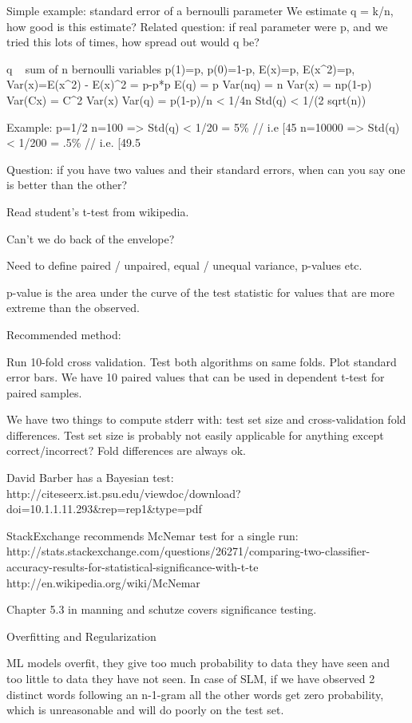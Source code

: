 \documentclass[ignorenonframetext]{beamer}
\begin{document}
Simple example: standard error of a bernoulli parameter
We estimate q = k/n, how good is this estimate?
Related question: if real parameter were p, and we tried this lots of
times, how spread out would q be?

q ~ sum of n bernoulli variables
p(1)=p, p(0)=1-p, E(x)=p, E(x^2)=p, Var(x)=E(x^2) - E(x)^2 = p-p*p 
E(q) = p
Var(nq) = n Var(x) = np(1-p)
Var(Cx) = C^2 Var(x)
Var(q) = p(1-p)/n < 1/4n
Std(q) < 1/(2 sqrt(n))

Example: p=1/2
n=100 => Std(q) < 1/20 = 5\%  // i.e [45%
n=10000 => Std(q) < 1/200 = .5\% // i.e. [49.5%

Question: if you have two values and their standard errors, when can
you say one is better than the other?

Read student's t-test from wikipedia.

Can't we do back of the envelope?

Need to define paired / unpaired, equal / unequal variance, p-values
etc.

p-value is the area under the curve of the test statistic for values
that are more extreme than the observed.

Recommended method:

Run 10-fold cross validation.
Test both algorithms on same folds.
Plot standard error bars.
We have 10 paired values that can be used in dependent t-test for
paired samples.

We have two things to compute stderr with: test set size and
cross-validation fold differences.  Test set size is probably not
easily applicable for anything except correct/incorrect?  Fold
differences are always ok.

David Barber has a Bayesian test:
http://citeseerx.ist.psu.edu/viewdoc/download?doi=10.1.1.11.293&rep=rep1&type=pdf

StackExchange recommends McNemar test for a single run:
http://stats.stackexchange.com/questions/26271/comparing-two-classifier-accuracy-results-for-statistical-significance-with-t-te
http://en.wikipedia.org/wiki/McNemar%

Chapter 5.3 in manning and schutze covers significance testing.



Overfitting and Regularization

ML models overfit, they give too much probability to data they have
seen and too little to data they have not seen.  In case of SLM, if we
have observed 2 distinct words following an n-1-gram all the other
words get zero probability, which is unreasonable and will do poorly
on the test set.
\end{document}

